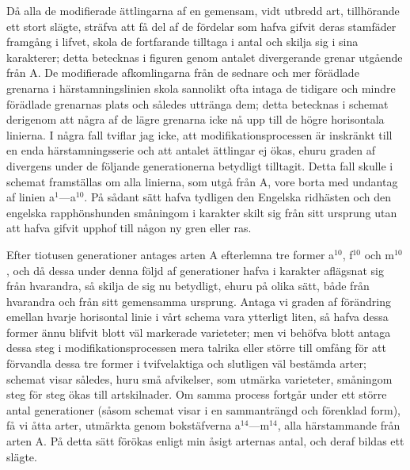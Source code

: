 Då alla de modifierade ättlingarna af en gemensam, vidt utbredd art, tillhörande ett stort slägte, sträfva att få del af de fördelar som hafva gifvit deras stamfäder framgång i lifvet, skola de fortfarande tilltaga i antal och skilja sig i sina karakterer; detta betecknas i figuren genom antalet divergerande grenar utgående från A. De modifierade afkomlingarna från de sednare och mer förädlade grenarna i härstamningslinien skola sannolikt ofta intaga de tidigare och mindre förädlade grenarnas plats och således uttränga dem; detta betecknas i schemat derigenom att några af de lägre grenarna icke nå upp till de högre horisontala linierna. I några fall tviflar jag icke, att modifikationsprocessen är inskränkt till en enda härstamningsserie och att antalet ättlingar ej ökas, ehuru graden af divergens under de följande generationerna betydligt tilltagit. Detta fall skulle i schemat framställas om alla linierna, som utgå från A, vore borta med undantag af linien a${}^1$—a${}^{10}$. På sådant sätt hafva tydligen den Engelska ridhästen och den engelska rapphönshunden småningom i karakter skilt sig från sitt ursprung utan att hafva gifvit upphof till någon ny gren eller ras.

Efter tiotusen generationer antages arten A efterlemna tre former a${}^{10}$, f${}^{10}$ och m${}^{10}$, och då dessa under denna följd af generationer hafva i karakter aflägsnat sig från hvarandra, så skilja de sig nu betydligt, ehuru på olika sätt, både från hvarandra och från sitt gemensamma ursprung. Antaga vi graden af förändring emellan hvarje horisontal linie i vårt schema vara ytterligt liten, så hafva dessa former ännu blifvit blott väl markerade varieteter; men vi behöfva blott antaga dessa steg i modifikationsprocessen mera talrika eller större till omfång för att förvandla dessa tre former i tvifvelaktiga och slutligen väl bestämda arter; schemat visar således, huru små afvikelser, som utmärka varieteter, småningom steg för steg ökas till artskilnader. Om samma process fortgår under ett större antal generationer (såsom schemat visar i en sammanträngd och förenklad form), få vi åtta arter, utmärkta genom bokstäfverna a${}^{14}$—m${}^{14}$, alla härstammande från arten A. På detta sätt förökas enligt min åsigt arternas antal, och deraf bildas ett slägte.

